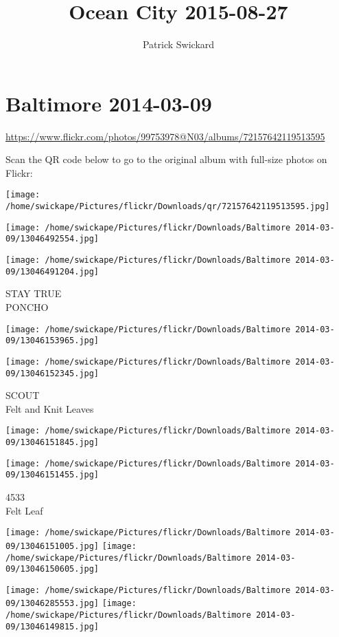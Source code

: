\documentclass[10pt,letterpaper]{article}
\title{Ocean City 2015-08-27}
\author{Patrick Swickard}
\date{}
\begin{document}
\section*{Baltimore 2014-03-09}

\url{https://www.flickr.com/photos/99753978@N03/albums/72157642119513595}

Scan the QR code below to go to the original album with full-size photos on Flickr:

\texttt{[image: /home/swickape/Pictures/flickr/Downloads/qr/72157642119513595.jpg]}
\pagebreak

\texttt{[image: /home/swickape/Pictures/flickr/Downloads/Baltimore 2014-03-09/13046492554.jpg]}

\vspace{0.25in}
\texttt{[image: /home/swickape/Pictures/flickr/Downloads/Baltimore 2014-03-09/13046491204.jpg]}

STAY TRUE\\
PONCHO
\pagebreak

\texttt{[image: /home/swickape/Pictures/flickr/Downloads/Baltimore 2014-03-09/13046153965.jpg]}

\vspace{0.25in}
\texttt{[image: /home/swickape/Pictures/flickr/Downloads/Baltimore 2014-03-09/13046152345.jpg]}

SCOUT\\
Felt and Knit Leaves
\pagebreak

\texttt{[image: /home/swickape/Pictures/flickr/Downloads/Baltimore 2014-03-09/13046151845.jpg]}

\vspace{0.25in}
\texttt{[image: /home/swickape/Pictures/flickr/Downloads/Baltimore 2014-03-09/13046151455.jpg]}

4533\\
Felt Leaf
\pagebreak

\texttt{[image: /home/swickape/Pictures/flickr/Downloads/Baltimore 2014-03-09/13046151005.jpg]}
\texttt{[image: /home/swickape/Pictures/flickr/Downloads/Baltimore 2014-03-09/13046150605.jpg]}

\texttt{[image: /home/swickape/Pictures/flickr/Downloads/Baltimore 2014-03-09/13046285553.jpg]}
\texttt{[image: /home/swickape/Pictures/flickr/Downloads/Baltimore 2014-03-09/13046149815.jpg]}
\end{document}
